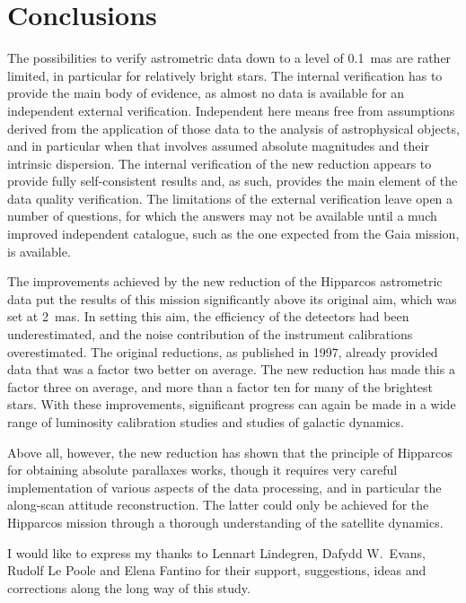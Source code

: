 \documentclass{aa}
\begin{document}
\section{Conclusions}
\label{sec:conclusion}

The possibilities to verify astrometric data down to a level of 
0.1~mas are rather limited, in particular for relatively bright stars. 
The internal verification has to provide the main
body of evidence, as almost no data is available for an independent external 
verification. Independent here means free from assumptions derived from the
application of those data to the analysis of astrophysical objects, and in 
particular when that involves assumed absolute magnitudes and their intrinsic
dispersion. The internal verification of the new reduction appears to provide
fully self-consistent results and, as such, provides the main element of the
data quality verification. The limitations of the external verification
leave open a number of questions, for which the answers may not be 
available until a much improved independent catalogue, such as the one 
expected from the Gaia mission, is available. 

The improvements achieved by the new reduction of the Hipparcos astrometric 
data put the results of this mission significantly above its original aim, 
which was set at 2~mas. In setting this aim, the efficiency of the detectors 
had been underestimated, and the noise contribution of the instrument 
calibrations overestimated. The original reductions, as published in 1997, 
already provided data that was a factor two better on average. The new 
reduction has made this a factor three on average, and more than a factor ten
for many of the brightest stars. With these improvements, significant 
progress can again be made in a wide range of luminosity calibration studies 
and studies of galactic dynamics.

Above all, however, the new reduction has shown that the principle of Hipparcos
for obtaining absolute parallaxes works, though it requires very careful
implementation of various aspects of the data processing, and in particular
the along-scan attitude reconstruction. The latter could only be achieved
for the Hipparcos mission through a thorough understanding of the satellite
dynamics.


\begin{acknowledgements}

I would like to express my thanks to Lennart Lindegren, Dafydd W.~Evans, 
Rudolf Le Poole and Elena Fantino for their support,  suggestions, ideas and 
corrections along the long way of this study.
 
\end{acknowledgements}




\end{document}

